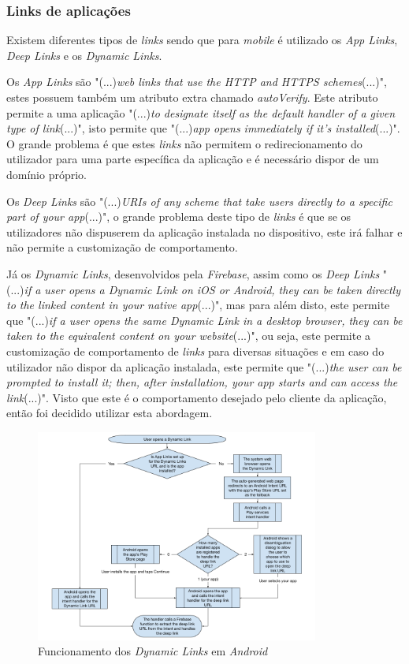\subsubsection{Links de aplicações}

Existem diferentes tipos de \textit{links} sendo que para \textit{mobile} é utilizado os \textit{App Links}, \textit{Deep Links} e os \textit{Dynamic Links}.

Os \emph{App Links} são "(...)\emph{web links that use the HTTP and HTTPS schemes}(...)"\citep{linking}, estes possuem também um atributo extra chamado \textit{autoVerify}. Este atributo permite a uma aplicação "(...)\emph{to designate itself as the default handler of a given type of link}(...)"\citep{linking}, isto permite que "(...)\emph{app opens immediately if it's installed}(...)"\citep{linking}. O grande problema é que estes \textit{links} não permitem o redirecionamento do utilizador para uma parte específica da aplicação e é necessário dispor de um domínio próprio.


Os \textit{Deep Links} são "(...)\emph{URIs of any scheme that take users directly to a specific part of your app}(...)"\citep{linking}, o grande problema deste tipo de \textit{links} é que se os utilizadores não dispuserem da aplicação instalada no dispositivo, este irá falhar e não permite a customização de comportamento.

Já os \textit{Dynamic Links}, desenvolvidos pela \textit{Firebase}, assim como os \textit{Deep Links} "(...)\emph{if a user opens a Dynamic Link on iOS or Android, they can be taken directly to the linked content in your native app}(...)"\citep{dynamic_linking}, mas para além disto, este permite que "(...)\emph{if a user opens the same Dynamic Link in a desktop browser, they can be taken to the equivalent content on your website}(...)"\citep{dynamic_linking}, ou seja, este permite a customização de comportamento de \textit{links} para diversas situações e em caso do utilizador não dispor da aplicação instalada, este permite que "(...)\emph{the user can be prompted to install it; then, after installation, your app starts and can access the link}(...)"\citep{dynamic_linking}. Visto que este é o comportamento desejado pelo cliente da aplicação, então foi decidido utilizar esta abordagem.

\begin{figure}[htb]
  \centering
  \includegraphics[width=0.83\textwidth]{images/diagramas/fdl-android-integration.png}
  \caption{Funcionamento dos \textit{Dynamic Links} em \textit{Android} \citep{linking_firebase}}
  \label{fig:23}
\end{figure}
